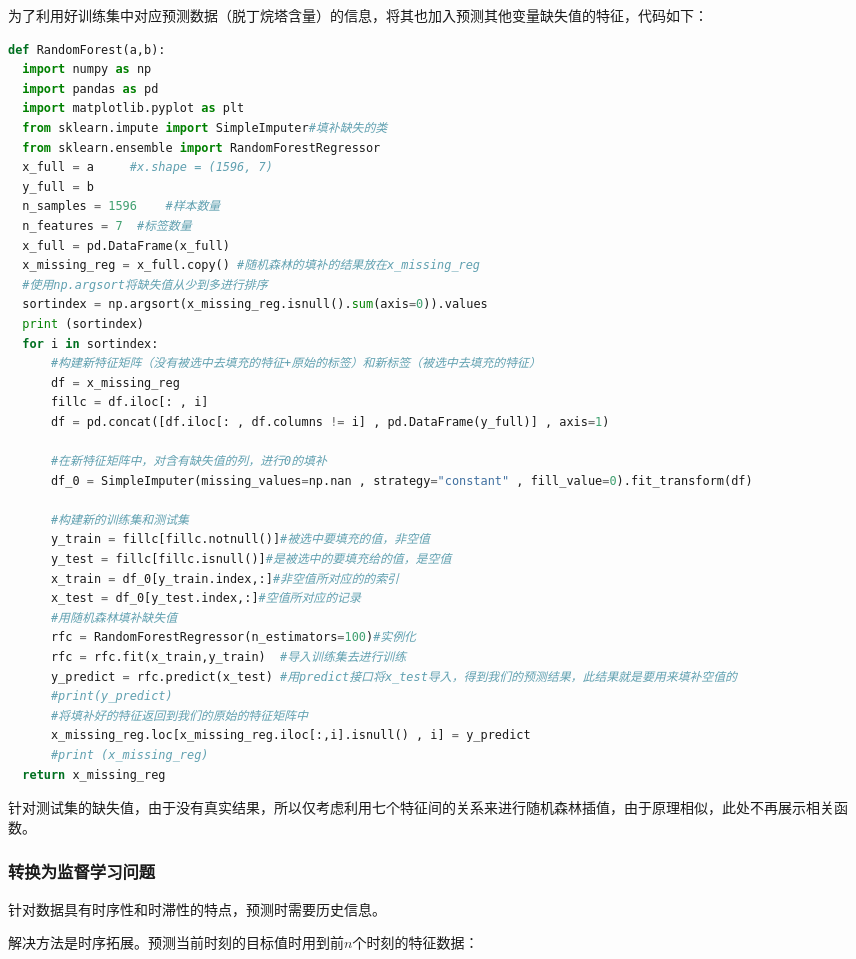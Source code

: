 \documentclass[11pt,a4paper]{elegantpaper}
\begin{document}
\begin{multicols}{2}
为了利用好训练集中对应预测数据（脱丁烷塔含量）的信息，将其也加入预测其他变量缺失值的特征，代码如下：

\begin{lstlisting}[language=Python]
def RandomForest(a,b):
  import numpy as np
  import pandas as pd
  import matplotlib.pyplot as plt
  from sklearn.impute import SimpleImputer#填补缺失的类
  from sklearn.ensemble import RandomForestRegressor
  x_full = a     #x.shape = (1596, 7)
  y_full = b
  n_samples = 1596    #样本数量
  n_features = 7  #标签数量
  x_full = pd.DataFrame(x_full)
  x_missing_reg = x_full.copy() #随机森林的填补的结果放在x_missing_reg
  #使用np.argsort将缺失值从少到多进行排序
  sortindex = np.argsort(x_missing_reg.isnull().sum(axis=0)).values
  print (sortindex)
  for i in sortindex:
      #构建新特征矩阵（没有被选中去填充的特征+原始的标签）和新标签（被选中去填充的特征）
      df = x_missing_reg
      fillc = df.iloc[: , i]
      df = pd.concat([df.iloc[: , df.columns != i] , pd.DataFrame(y_full)] , axis=1)

      #在新特征矩阵中，对含有缺失值的列，进行0的填补
      df_0 = SimpleImputer(missing_values=np.nan , strategy="constant" , fill_value=0).fit_transform(df)
      
      #构建新的训练集和测试集
      y_train = fillc[fillc.notnull()]#被选中要填充的值，非空值
      y_test = fillc[fillc.isnull()]#是被选中的要填充给的值，是空值
      x_train = df_0[y_train.index,:]#非空值所对应的的索引
      x_test = df_0[y_test.index,:]#空值所对应的记录
      #用随机森林填补缺失值
      rfc = RandomForestRegressor(n_estimators=100)#实例化
      rfc = rfc.fit(x_train,y_train)  #导入训练集去进行训练
      y_predict = rfc.predict(x_test) #用predict接口将x_test导入，得到我们的预测结果，此结果就是要用来填补空值的
      #print(y_predict)
      #将填补好的特征返回到我们的原始的特征矩阵中
      x_missing_reg.loc[x_missing_reg.iloc[:,i].isnull() , i] = y_predict
      #print (x_missing_reg)
  return x_missing_reg
\end{lstlisting}

针对测试集的缺失值，由于没有真实结果，所以仅考虑利用七个特征间的关系来进行随机森林插值，由于原理相似，此处不再展示相关函数。


\subsubsection{转换为监督学习问题}

针对数据具有时序性和时滞性的特点，预测时需要历史信息。

解决方法是时序拓展。预测当前时刻的目标值时用到前$n$个时刻的特征数据：


\end{multicols}
\end{document}

